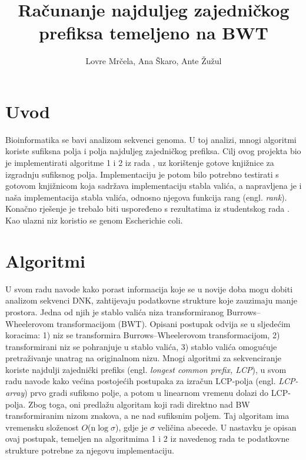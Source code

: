 \documentclass[times, utf8, seminar]{fer}
\begin{document}
\title{Računanje najduljeg zajedničkog prefiksa temeljeno na BWT}

\author{Lovre Mrčela, Ana Škaro, Ante Žužul}


\maketitle

\tableofcontents

\chapter{Uvod}

Bioinformatika se bavi analizom sekvenci genoma. U toj analizi, mnogi algoritmi koriste sufiksna polja i polja najduljeg zajedničkog prefiksa. Cilj ovog projekta bio je implementirati algoritme 1 i 2 iz rada \cite{beller2013}, uz korištenje gotove knjižnice za izgradnju sufiksnog polja. Implementaciju je potom bilo potrebno testirati s gotovom knjižnicom koja sadržava implementaciju stabla valića, a napravljena je i naša implementacija stabla valića, odnosno njegova funkcija rang (engl. \textit{rank}). Konačno rješenje je trebalo biti uspoređeno s rezultatima iz studentskog rada \cite{studenti2016}. Kao ulazni niz koristio se genom Escherichie coli.

\chapter{Algoritmi}
U svom radu \cite{beller2013} navode kako porast informacija koje se u novije doba mogu dobiti analizom sekvenci DNK, zahtijevaju podatkovne strukture koje zauzimaju manje prostora. Jedna od njih je stablo valića niza transformiranog Burrows--Wheelerovom transformacijom (BWT). Opisani postupak odvija se u sljedećim koracima: 1) niz se transformira Burrows--Wheelerovom transformacijom, 2) transformirani niz se pohranjuje u stablo valića, 3) stablo valića omogućuje pretraživanje unatrag na originalnom nizu.
Mnogi algoritmi za sekvenciranje koriste najdulji zajednički prefiks (engl. \textit{longest common prefix, LCP}), \cite{beller2013} u svom radu navode kako većina postojećih postupaka za izračun LCP-polja (engl. \textit{LCP-array}) prvo gradi sufiksno polje, a potom u linearnom vremenu dolazi do LCP-polja. Zbog toga, oni predlažu algoritam koji radi direktno nad BW transformiranim nizom znakova, a ne nad sufiksnim poljem. Taj algoritam ima vremensku složenost $O$(n$\log\sigma$), gdje je $\sigma$ veličina abecede. U nastavku je opisan ovaj postupak, temeljen na algoritmima 1 i 2 iz navedenog rada te podatkovne strukture potrebne za njegovu implementaciju.
\end{document}

